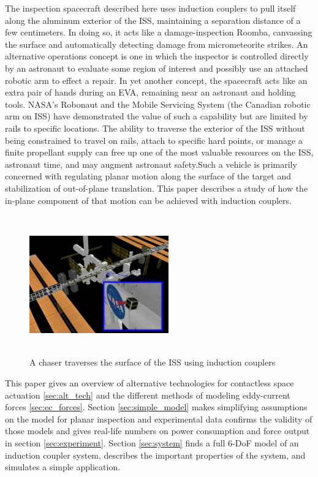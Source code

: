 The inspection spacecraft described here uses induction couplers to pull itself along the aluminum exterior of the ISS, maintaining a separation distance of a few centimeters. In doing so, it acts like a damage-inspection Roomba,\cite{Tribelhorn2007}
 canvassing the surface and automatically detecting damage from micrometeorite strikes. An alternative operations concept is one in which the inspector is controlled directly by an astronaut to evaluate some region of interest and possibly use an attached robotic arm to effect a repair. In yet another concept, the spacecraft acts like an extra pair of hands during an EVA, remaining near an astronaut and holding tools. NASA's Robonaut and the Mobile Servicing System (the Canadian robotic arm on ISS) have demonstrated the value of such a capability but are limited by rails to specific locations. \cite{Ambrose2012}
The ability to traverse the exterior of the ISS without being constrained to travel on rails, attach to specific hard points, or manage a finite propellant supply can free up one of the most valuable resources on the ISS, astronaut time, and may augment astronaut safety.Such a vehicle is primarily concerned with regulating planar motion along the surface of the target and stabilization of out-of-plane translation. This paper describes a study of how the in-plane component of that motion can be achieved with induction couplers.

\begin{figure}
\includegraphics[width = 6cm, height = 6cm ]{figures/iss_inspector.jpg}
\caption{A chaser traverses the surface of the ISS using induction couplers}
\label{fig:iss_inspector}
\end{figure}
 
This paper gives an overview of alternative technologies for contactless space actuation \ref{sec:alt_tech} and the different methods of modeling eddy-current forces \ref{sec:ec_forces}. Section \ref{sec:simple_model} makes simplifying assumptions on the model for planar inspection and experimental data confirms the validity of those models and gives real-life numbers on power consumption and force output in section \ref{sec:experiment}. Section \ref{sec:system} finds a full 6-DoF model of an induction coupler system, describes the important properties of the system, and simulates a simple application.   




